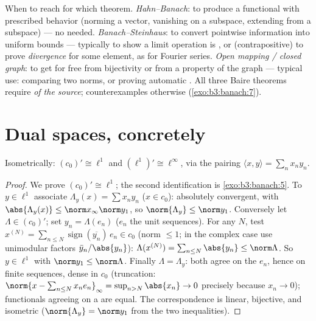 \begin{method}\label{met:b3:banach:trilogy}
When to reach for which theorem. \emph{Hahn--Banach}: to
produce a functional with prescribed behavior (norming a
vector, vanishing on a subspace, extending from a subspace) ---
no  needed. \emph{Banach--Steinhaus}: to convert
pointwise information into uniform bounds --- typically to show
a limit operation is , or (contrapositive) to prove
\emph{divergence} for some element, as for Fourier series.
\emph{Open mapping / closed graph}: to get  for free
from  bijectivity or from a  property of the
graph --- typical use: comparing two  norms, or proving
automatic . All three Baire theorems require
 \emph{of the source}; counterexamples otherwise
(\cref{exo:b3:banach:7}).
\end{method}

\section{Dual spaces, concretely}

\begin{theorem}\label{thm:b3:banach:duals}
Isometrically: $(c_0)' \cong \ell^1$ and $(\ell^1)' \cong
\ell^\infty$, via the pairing $\langle x, y\rangle = \sum_n
x_ny_n$.
\end{theorem}

\begin{proof}
We prove $(c_0)' \cong \ell^1$; the second identification is
\cref{exo:b3:banach:5}. To $y \in \ell^1$ associate $\Lambda_y(x)
= \sum x_ny_n$ ($x \in c_0$): absolutely convergent, with
$\abs{\Lambda_y(x)} \leq \norm x_\infty\norm y_1$, so
$\norm{\Lambda_y} \leq \norm y_1$. Conversely let $\Lambda \in
(c_0)'$; set $y_n = \Lambda(e_n)$ ($e_n$ the unit sequences).
For any $N$, test $x^{(N)} = \sum_{n \leq N}
\operatorname{sign}(\overline{y_n})\,e_n \in c_0$ (norm $\leq
1$; in the complex case use unimodular factors $\bar y_n/\abs
{y_n}$): $\Lambda(x^{(N)}) = \sum_{n\leq N}\abs{y_n} \leq
\norm\Lambda$. So $y \in \ell^1$ with $\norm y_1 \leq
\norm\Lambda$. Finally $\Lambda = \Lambda_y$: both agree on the
$e_n$, hence on finite sequences, dense in $c_0$ (truncation:
$\norm{x - \sum_{n \leq N}x_ne_n}_\infty = \sup_{n > N}\abs{x_n}
\to 0$ precisely because $x_n \to 0$);  functionals
agreeing on a  are equal. The correspondence is linear,
bijective, and isometric ($\norm{\Lambda_y} = \norm y_1$ from
the two inequalities).
\end{proof}

